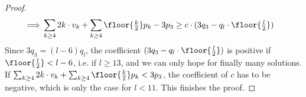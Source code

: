 \begin{proposition}
\begin{proof}
\begin{align*}
      \implies & \sum_{k \geq 4} 2k \cdot v_k + \sum_{k \geq 4} \floor{\tfrac{k}{2}} p_k - 3p_3 \geq c \cdot (3 q_3 - q_l \cdot \floor{\tfrac{l}{2}})
    \end{align*}
    Since $3q_3 = (l - 6)q_l$, the coefficient $(3 q_3 - q_l \cdot \floor{\tfrac{l}{2}})$ is positive if $\floor{\frac{l}{2}} < l - 6$, i.e. if $l \geq 13$, and we can only hope for finally many solutions. If $\sum_{k \geq 4} 2k \cdot v_k + \sum_{k \geq 4} \floor{\tfrac{k}{2}} p_k < 3p_3$, the coefficient of $c$ has to be negative, which is only the case for $l < 11$. This finishes the proof.
  \end{proof}
\end{proposition}

